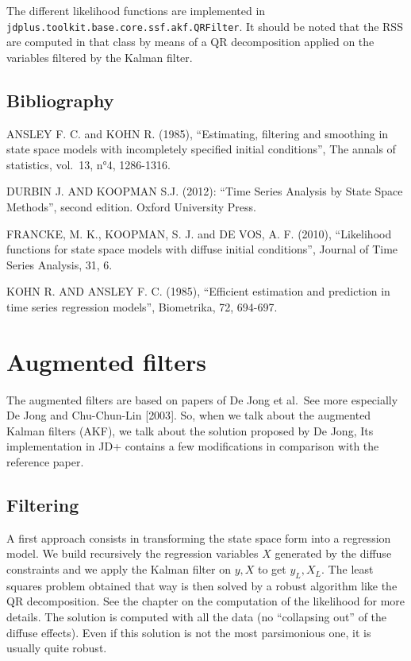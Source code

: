 \documentclass[
  letterpaper,
  DIV=11,
  numbers=noendperiod]{scrreprt}
\begin{document}
The different likelihood functions are implemented in
\texttt{jdplus.toolkit.base.core.ssf.akf.QRFilter}. It should be noted
that the RSS are computed in that class by means of a QR decomposition
applied on the variables filtered by the Kalman filter.

\section{Bibliography}\label{bibliography-1}

ANSLEY F. C. and KOHN R. (1985), ``Estimating, filtering and smoothing
in state space models with incompletely specified initial conditions'',
The annals of statistics, vol.~13, n°4, 1286-1316.

DURBIN J. AND KOOPMAN S.J. (2012): ``Time Series Analysis by State Space
Methods'', second edition. Oxford University Press.

FRANCKE, M. K., KOOPMAN, S. J. and DE VOS, A. F. (2010), ``Likelihood
functions for state space models with diffuse initial conditions'',
Journal of Time Series Analysis, 31, 6.

KOHN R. AND ANSLEY F. C. (1985), ``Efficient estimation and prediction
in time series regression models'', Biometrika, 72, 694-697.

\chapter{Augmented filters}\label{augmented-filters}

The augmented filters are based on papers of De Jong et al.~See more
especially De Jong and Chu-Chun-Lin {[}2003{]}. So, when we talk about
the augmented Kalman filters (AKF), we talk about the solution proposed
by De Jong, Its implementation in JD+ contains a few modifications in
comparison with the reference paper.

\section{Filtering}\label{filtering}

A first approach consists in transforming the state space form into a
regression model. We build recursively the regression variables \(X\)
generated by the diffuse constraints and we apply the Kalman filter on
\(y, X\) to get \(y_L, X_L\). The least squares problem obtained that
way is then solved by a robust algorithm like the QR decomposition. See
the chapter on the computation of the likelihood for more details. The
solution is computed with all the data (no ``collapsing out'' of the
diffuse effects). Even if this solution is not the most parsimonious
one, it is usually quite robust.
\end{document}
